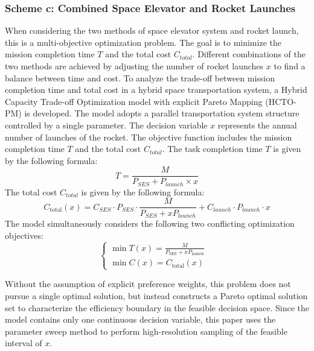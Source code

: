 \subsubsection{Scheme c: Combined Space Elevator and Rocket Launches}
\vspace{0.3em}
When considering the two methods of space elevator system and rocket launch, this is a multi-objective optimization problem. The goal is to minimize the mission completion time $T$ and the total cost $C_{total}$. 
Different combinations of the two methods are achieved by adjusting the number of rocket launches $x$ to find a balance between time and cost.
To analyze the trade-off between mission completion time and total cost in a hybrid space transportation system,
a Hybrid Capacity Trade-off Optimization model with explicit Pareto Mapping (HCTO-PM) is developed.
The model adopts a parallel transportation system structure controlled by a single parameter. The decision variable $x$ represents the annual number of launches of the rocket. The objective function includes the mission completion time $T$ and the total cost $C_{total}$.
The task completion time $T$ is given by the following formula:
\[T = \frac{M}{P_{SES} + P_{launch} \times x} \]
The total cost $C_{total}$ is given by the following formula:
\[C_{\mathrm{total}}(x)=C_{SES}\cdot P_{SES}\cdot\frac{M}{P_{SES}+xP_{launch}}+C_{launch}\cdot P_{launch}\cdot x\]
The model simultaneously considers the following two conflicting optimization objectives:
\[\begin{cases}
\min T(x)=\frac{M}{P_{\mathrm{SES}}+xP_{\mathrm{launch}}} \\
\min C(x)=C_{\mathrm{total}}(x) & 
\end{cases}\]


\indent Without the assumption of explicit preference weights, this problem does not pursue a single optimal solution, 
but instead constructs a Pareto optimal solution set to characterize the efficiency boundary in the feasible decision space.
Since the model contains only one continuous decision variable, this paper uses the parameter sweep method to
perform high-resolution sampling of the feasible interval of $x$.

